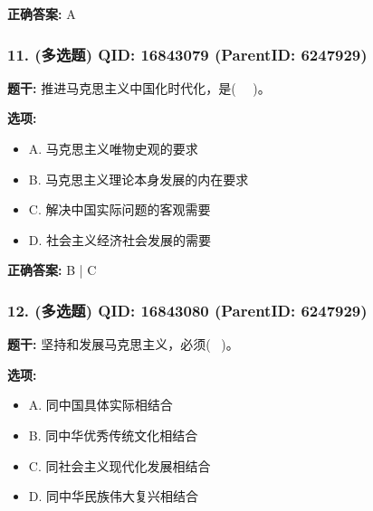 \documentclass[12pt,UTF8]{ctexart}
\begin{document}
\textbf{正确答案:}
A

\vspace{0.3em}\hrulefill\vspace{0.7em}

\subsubsection*{11. (多选题) \small QID: 16843079 (ParentID: 6247929)}

\textbf{题干:}
推进马克思主义中国化时代化，是(   )。



\textbf{选项:}
\begin{itemize}[leftmargin=*]

  \item A. 马克思主义唯物史观的要求

  \item B. 马克思主义理论本身发展的内在要求

  \item C. 解决中国实际问题的客观需要

  \item D. 社会主义经济社会发展的需要

\end{itemize}

\textbf{正确答案:}
B | C

\vspace{0.3em}\hrulefill\vspace{0.7em}

\subsubsection*{12. (多选题) \small QID: 16843080 (ParentID: 6247929)}

\textbf{题干:}
坚持和发展马克思主义，必须(  )。



\textbf{选项:}
\begin{itemize}[leftmargin=*]

  \item A. 同中国具体实际相结合

  \item B. 同中华优秀传统文化相结合

  \item C. 同社会主义现代化发展相结合

  \item D. 同中华民族伟大复兴相结合

\end{itemize}
\end{document}
